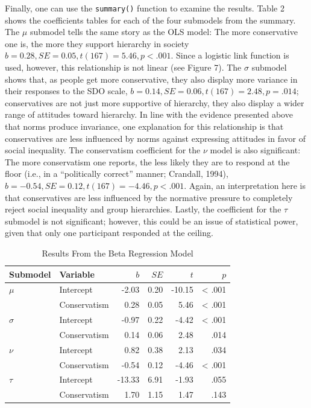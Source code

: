 \documentclass[english,,man]{apa6}
\begin{document}
Finally, one can use the \texttt{summary()} function to examine the results. Table 2 shows the coefficients tables for each of the four submodels from the summary. The \(\mu\) submodel tells the same story as the OLS model: The more conservative one is, the more they support hierarchy in society \(b = 0.28, SE = 0.05, t(167) = 5.46, p < .001\). Since a logistic link function is used, however, this relationship is not linear (see Figure 7). The \(\sigma\) submodel shows that, as people get more conservative, they also display more variance in their responses to the SDO scale, \(b = 0.14, SE = 0.06, t(167) = 2.48, p = .014\); conservatives are not just more supportive of hierarchy, they also display a wider range of attitudes toward hierarchy. In line with the evidence presented above that norms produce invariance, one explanation for this relationship is that conservatives are less influenced by norms against expressing attitudes in favor of social inequality. The conservatism coefficient for the \(\nu\) model is also significant: The more conservatism one reports, the less likely they are to respond at the floor (i.e., in a ``politically correct'' manner; Crandall, 1994), \(b = -0.54, SE = 0.12, t(167) = -4.46, p < .001\). Again, an interpretation here is that conservatives are less influenced by the normative pressure to completely reject social inequality and group hierarchies. Lastly, the coefficient for the \(\tau\) submodel is not significant; however, this could be an issue of statistical power, given that only one participant responded at the ceiling.

\begin{table}[tbp]
\begin{center}
\begin{threeparttable}
\caption{\label{tab:unnamed-chunk-17}Results From the Beta Regression Model}
\begin{tabular}{llrrrr}
\toprule
Submodel & Variable & $b$ & $SE$ & $t$ & $p$\\
\midrule
$\mu$ & Intercept & -2.03 & 0.20 & -10.15 & < .001\\
 & Conservatism & 0.28 & 0.05 & 5.46 & < .001\\
$\sigma$ & Intercept & -0.97 & 0.22 & -4.42 & < .001\\
 & Conservatism & 0.14 & 0.06 & 2.48 & .014\\
$\nu$ & Intercept & 0.82 & 0.38 & 2.13 & .034\\
 & Conservatism & -0.54 & 0.12 & -4.46 & < .001\\
$\tau$ & Intercept & -13.33 & 6.91 & -1.93 & .055\\
 & Conservatism & 1.70 & 1.15 & 1.47 & .143\\
\bottomrule
\end{tabular}
\end{threeparttable}
\end{center}
\end{table}
\end{document}
